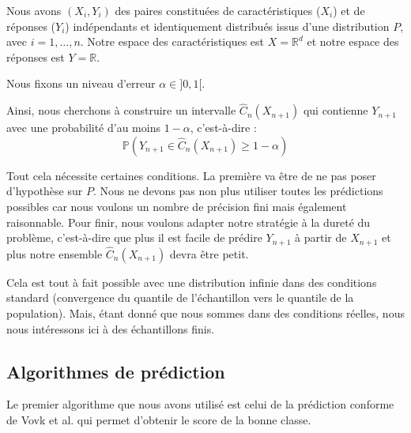 \documentclass[a4paper,12pt]{article}
\begin{document}
\vspace{0.2cm}

Nous avons $(X_i, Y_i)$ des paires constituées de caractéristiques ($X_i$) et de réponses ($Y_i$) indépendants et identiquement distribués issus d'une distribution $P$, avec $i = 1, \dots, n$. Notre espace des caractéristiques est $X = \mathbb R^d$ et notre espace des réponses est $Y = \mathbb R$.

\vspace{0.2cm}

Nous fixons un niveau d'erreur $\alpha \in ]0,1[$.

\vspace{0.2cm}

Ainsi, nous cherchons à construire un intervalle $\hat C_n (X_{n+1})$ qui contienne $Y_{n+1}$ avec une probabilité d'au moins $1- \alpha$, c'est-à-dire : $$ \mathbb P(Y_{n+1} \in \hat C_n (X_{n+1}) \geq 1 - \alpha) $$

\vspace{0.2cm}

Tout cela nécessite certaines conditions. La première va être de ne pas poser d'hypothèse sur $P$. Nous ne devons pas non plus utiliser toutes les prédictions possibles car nous voulons un nombre de précision fini mais également raisonnable. Pour finir, nous voulons adapter notre stratégie à la dureté du problème, c'est-à-dire que plus il est facile de prédire $Y_{n+1}$ à partir de $X_{n+1}$ et plus notre ensemble $\hat C_n(X_{n+1})$ devra être petit.

\vspace{0.2cm}

Cela est tout à fait possible avec une distribution infinie dans des conditions standard (convergence du quantile de l'échantillon vers le quantile de la population). Mais, étant donné que nous sommes dans des conditions réelles, nous nous intéressons ici à des échantillons finis.


\subsection{Algorithmes de prédiction}

Le premier algorithme que nous avons utilisé est celui de la prédiction conforme de Vovk et al.  qui permet d'obtenir le score de la bonne classe.
\end{document}
